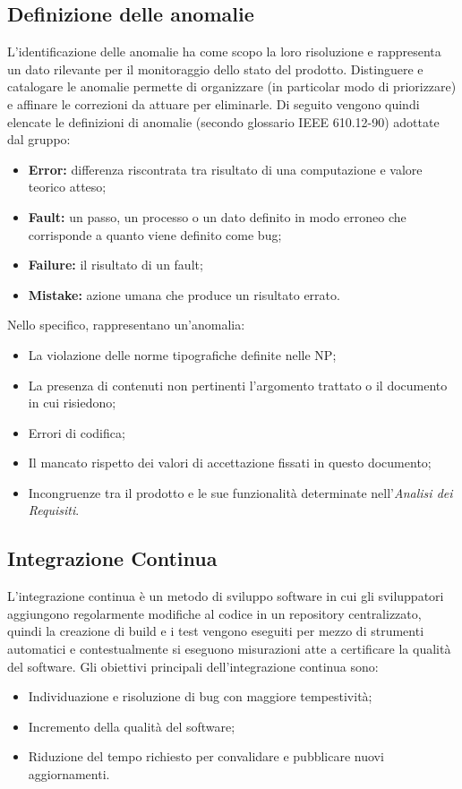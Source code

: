 \documentclass[../NormediProgetto.tex]{subfiles}
\begin{document}
\subsection{Definizione delle anomalie}

L’identificazione delle anomalie ha come scopo la loro risoluzione e rappresenta un dato rilevante per il monitoraggio dello stato del prodotto. Distinguere e catalogare le anomalie permette di organizzare (in particolar modo di priorizzare) e affinare le correzioni da attuare per eliminarle. Di seguito
vengono quindi elencate le definizioni di anomalie (secondo glossario IEEE 610.12-90) adottate dal gruppo:

\begin{itemize}
	\item \textbf{Error:} differenza riscontrata tra risultato di una computazione e valore teorico atteso;
	\item \textbf{Fault:} un passo, un processo o un dato definito in modo erroneo che corrisponde a quanto viene definito come bug;
	\item \textbf{Failure:} il risultato di un fault;
	\item \textbf{Mistake:} azione umana che produce un risultato errato.
\end{itemize}

Nello specifico, rappresentano un'anomalia:

\begin{itemize}
	\item La violazione delle norme tipografiche definite nelle NP;
	\item La presenza di contenuti non pertinenti l'argomento trattato o il documento in cui risiedono;
	\item Errori di codifica;
	\item Il mancato rispetto dei valori di accettazione fissati in questo documento;
	\item Incongruenze tra il prodotto e le sue funzionalità determinate nell'\textit{Analisi dei Requisiti}.
\end{itemize}

\subsection{Integrazione Continua}

L'integrazione continua è un metodo di sviluppo software in cui gli sviluppatori aggiungono regolarmente modifiche al codice in un repository centralizzato, quindi la creazione di build e i test vengono eseguiti per mezzo di strumenti automatici e contestualmente si eseguono misurazioni atte a certificare la qualità del software. Gli obiettivi principali dell'integrazione continua sono:
\begin{itemize}
	\item Individuazione e risoluzione di bug con maggiore tempestività;
	\item Incremento della qualità del software;
	\item Riduzione del tempo richiesto per convalidare e pubblicare nuovi aggiornamenti.
\end{itemize} 
\end{document}
